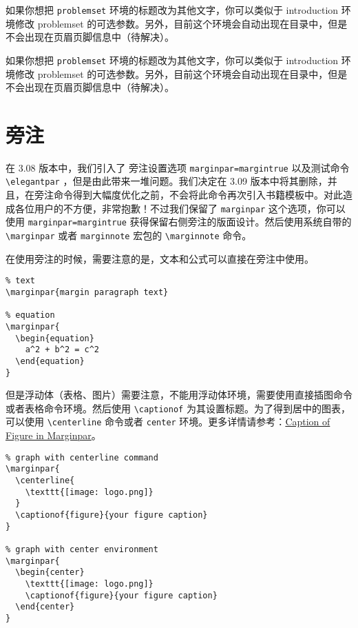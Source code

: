 \documentclass[cn,10pt,math=newtx,citestyle=gb7714-2015,bibstyle=gb7714-2015]{elegantbook}
\begin{document}
\begin{remark}
如果你想把 \lstinline{problemset} 环境的标题改为其他文字，你可以类似于 introduction 环境修改 problemset 的可选参数。另外，目前这个环境会自动出现在目录中，但是不会出现在页眉页脚信息中（待解决）。
\end{remark}

\begin{solution}
如果你想把 \lstinline{problemset} 环境的标题改为其他文字，你可以类似于 introduction 环境修改 problemset 的可选参数。另外，目前这个环境会自动出现在目录中，但是不会出现在页眉页脚信息中（待解决）。
\end{solution}

\section{旁注}

在 3.08 版本中，我们引入了 旁注设置选项 \lstinline{marginpar=margintrue} 以及测试命令 \lstinline{\elegantpar} ，但是由此带来一堆问题。我们决定在 3.09 版本中将其删除，并且，在旁注命令得到大幅度优化之前，不会将此命令再次引入书籍模板中。对此造成各位用户的不方便，非常抱歉！不过我们保留了 \lstinline{marginpar} 这个选项，你可以使用 \lstinline{marginpar=margintrue} 获得保留右侧旁注的版面设计。然后使用系统自带的 \lstinline{\marginpar} 或者 \lstinline{marginnote} 宏包的 \lstinline{\marginnote} 命令。

\begin{remark}
在使用旁注的时候，需要注意的是，文本和公式可以直接在旁注中使用。

\begin{lstlisting}
% text
\marginpar{margin paragraph text}

% equation
\marginpar{
  \begin{equation}
    a^2 + b^2 = c^2
  \end{equation}
}
\end{lstlisting}

但是浮动体（表格、图片）需要注意，不能用浮动体环境，需要使用直接插图命令或者表格命令环境。然后使用 \lstinline{\captionof} 为其设置标题。为了得到居中的图表，可以使用 \lstinline{\centerline} 命令或者 \lstinline{center} 环境。更多详情请参考：\href{https://tex.stackexchange.com/questions/5583/caption-of-figure-in-marginpar-and-caption-of-wrapfigure-in-margin}{Caption of Figure in Marginpar}。

\begin{lstlisting}
% graph with centerline command
\marginpar{
  \centerline{
    \texttt{[image: logo.png]}
  }
  \captionof{figure}{your figure caption}
}

% graph with center environment
\marginpar{
  \begin{center}
    \texttt{[image: logo.png]}
    \captionof{figure}{your figure caption}
  \end{center}
}
\end{lstlisting}

\end{remark}
\end{document}

